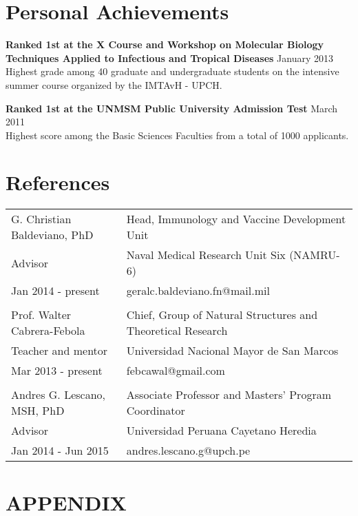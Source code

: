 \documentclass[margin,line]{res}
\begin{document}
\begin{resume}
\section{\sc Personal Achievements}

{\bf Ranked 1st at the X Course and Workshop on Molecular Biology \\Techniques Applied to Infectious and Tropical Diseases} \hfill January 2013\\
Highest grade among 40 graduate and undergraduate students on the intensive summer course organized by the IMTAvH - UPCH.

{\bf Ranked 1st at the UNMSM Public University Admission Test} \hfill March 2011\\
Highest score among the Basic Sciences Faculties from a total of 1000 applicants.\\%



\section{\sc References }

\begin{tabular}{ l l }
	G. Christian Baldeviano, PhD & Head, Immunology and Vaccine Development Unit \\
	Advisor & Naval Medical Research Unit Six (NAMRU-6)\\
	Jan 2014 - present & geralc.baldeviano.fn@mail.mil\\
	&\\
	Prof. Walter Cabrera-Febola & Chief, Group of Natural Structures and Theoretical Research \\
	Teacher and mentor & Universidad Nacional Mayor de San Marcos\\
	Mar 2013 - present & febcawal@gmail.com\\
	&\\
	Andres G. Lescano, MSH, PhD & Associate Professor and Masters' Program Coordinator\\
	Advisor & Universidad Peruana Cayetano Heredia\\
	Jan 2014 - Jun 2015 & andres.lescano.g@upch.pe\\
\end{tabular}

\newpage

\section{\scshape APPENDIX }


\end{resume}
\end{document}
